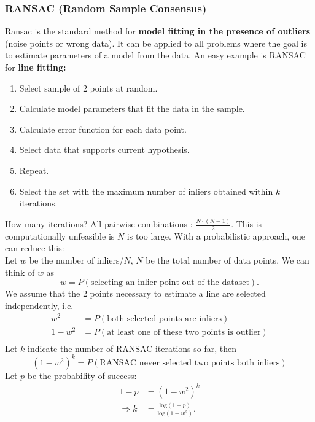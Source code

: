 \documentclass[a4paper,12 pt]{article}
\theoremstyle{definition}
\theoremstyle{remark}
\theoremstyle{definition}
\theoremstyle{definition}
\theoremstyle{definition}
\theoremstyle{remark}
\theoremstyle{definition}
\begin{document}
\subsubsection*{RANSAC (Random Sample Consensus)}
Ransac is the standard method for \textbf{model fitting in the presence of outliers} (noise points or wrong data). It can be applied to all problems where the goal is to estimate parameters of a model from the data. An easy example is RANSAC for \textbf{line fitting:}
\begin{enumerate}
\item Select sample of 2 points at random.
\item Calculate model parameters that fit the data in the sample.
\item Calculate error function for each data point.
\item Select data that supports current hypothesis.
\item Repeat.
\item Select the set with the maximum number of inliers obtained within $k$ iterations.
\end{enumerate}
How many iterations? All pairwise combinations : $\frac{N\cdot (N-1)}{2}$. This is computationally unfeasible is $N$ is too large. With a probabilistic approach, one can reduce this:\\
Let $w$ be the number of inliers/$N$, $N$ be the total number of data points. We can think of $w$ as
\begin{equation}
w=P(\text{selecting an inlier-point out of the dataset}).
\end{equation}
We assume that the 2 points necessary to estimate a line are selected independently, i.e.
\begin{equation}
\begin{split}
w^2&=P(\text{both selected points are inliers})\\
1-w^2&=P(\text{at least one of these two points is outlier})\\
\end{split}
\end{equation}
Let $k$ indicate the number of RANSAC iterations so far, then
\begin{equation}
(1-w^2)^k=P(\text{RANSAC never selected two points both inliers})
\end{equation}
Let $p$ be the probability of success:
\begin{equation}
\begin{split}
1-p&=(1-w^2)^k\\
\Rightarrow k&=\frac{\text{log}(1-p)}{\text{log}(1-w^2)}.
\end{split}
\end{equation}
\end{document}
